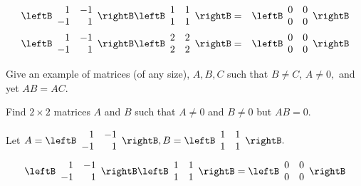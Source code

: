 \begin{enumialphparenastyle}
\begin{ex}
\begin{sol}
\begin{eqnarray*}
\leftB
\begin{array}{rr}
1 & -1 \\
-1 & 1
\end{array}
\rightB \leftB
\begin{array}{cc}
1 & 1 \\
1 & 1
\end{array}
\rightB  &=& \leftB
\begin{array}{cc}
0 & 0 \\
0 & 0
\end{array}
\rightB \\
 \leftB
\begin{array}{rr}
1 & -1 \\
-1 & 1
\end{array}
\rightB \leftB
\begin{array}{cc}
2 & 2 \\
2 & 2
\end{array}
\rightB &=& \leftB
\begin{array}{cc}
0 & 0 \\
0 & 0
\end{array}
\rightB
\end{eqnarray*}
\end{sol}
\end{ex}

\begin{ex} Give an example of matrices (of any size), $A,B,C$ such that $B\neq C$, $A\neq 0,$
and yet $AB=AC.$ 
\end{ex}

\begin{ex} Find $2 \times 2$ matrices $A$ and $B$ such that $A \neq 0$ and $B \neq 0$ but $AB = 0$. 
\begin{sol}
Let $A = \leftB
\begin{array}{rr}
1 & -1 \\
-1 & 1
\end{array}
\rightB, B = \leftB
\begin{array}{cc}
1 & 1 \\
1 & 1
\end{array}
\rightB.$ 
\[
\leftB
\begin{array}{rr}
1 & -1 \\
-1 & 1
\end{array}
\rightB \leftB
\begin{array}{cc}
1 & 1 \\
1 & 1
\end{array}
\rightB =\allowbreak \leftB
\begin{array}{cc}
0 & 0 \\
0 & 0
\end{array}
\rightB
\]
\end{sol}
\end{ex}


\end{enumialphparenastyle}
